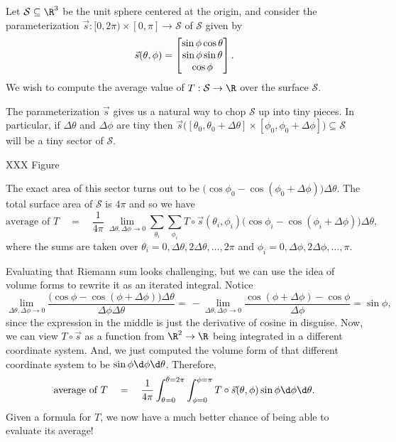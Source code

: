 \begin{example}
	\label{EXSURFACEAREABYDEF}
	Let $\mathcal S\subseteq \R^3$ be the unit sphere centered at the origin,
	and consider the parameterization $\vec s:[0,2\pi)\times[0,\pi]\to\mathcal S$ of $\mathcal S$ given
	by
	\[
		\vec s(\theta,\phi) = \begin{bmatrix}\sin\phi\cos\theta\\\sin\phi\sin\theta\\\cos\phi\end{bmatrix}.
	\]
	We wish to compute the average value of $T:\mathcal S\to\R$ over the surface $\mathcal S$.

	The parameterization $\vec s$ gives us a natural way to chop $\mathcal S$ up into tiny pieces.
	In particular, if $\Delta \theta$ and $\Delta \phi$ are tiny then $\vec s\big([\theta_0,\theta_0+\Delta
	\theta]\times[\phi_0,\phi_0+\Delta\phi]\big)\subseteq\mathcal S$ will be a tiny sector
	of $\mathcal S$.

	XXX Figure

	The exact area of this sector turns out to be $\big(\cos\phi_0-\cos(\phi_0+\Delta\phi)\big)\Delta\theta$.
	The total surface area of $\mathcal S$ is $4\pi$ and so we have
	\[
		\text{average of }T\quad=\quad \frac{1}{4\pi}\  \lim_{\Delta\theta,\Delta\phi\to0}
		\sum_{\theta_i}\sum_{\phi_i} T\circ \vec s(\theta_i,\phi_i)\Big(\cos\phi_i-\cos(\phi_i+\Delta\phi)\Big)\Delta\theta,
	\]
	where the sums are taken over $\theta_i=0,\Delta\theta,2\Delta\theta,\ldots,2\pi$ and
	$\phi_i=0,\Delta\phi,2\Delta\phi,\ldots,\pi$.

	Evaluating that Riemann sum looks challenging, but we can use the idea of volume
	forms to rewrite it as an iterated integral.  Notice
	\[
		\lim_{\Delta\theta,\Delta\phi\to0} \frac{\big(\cos\phi-\cos(\phi+\Delta\phi)\big)\Delta \theta}
		{\Delta \phi\Delta\theta}
		=\,-\lim_{\Delta\theta,\Delta\phi\to0} \frac{\cos(\phi+\Delta\phi)-\cos\phi}
		{\Delta \phi} = \sin\phi,
	\]
	since the expression in the middle is just the derivative of cosine in disguise.  Now,
	we can view $T\circ \vec s$ as a function from $\R^2\to\R$ being integrated in a different
	coordinate system.  And, we just computed the volume form of that different coordinate
	system to be $\sin\phi\d\phi\d\theta$.  Therefore,
	\[
		\text{average of }T\quad=\quad\frac{1}{4\pi}\int_{\theta=0}^{\theta=2\pi}\int_{\phi=0}^{\phi=\pi}
		T\circ \vec s(\theta,\phi)\sin\phi\d\phi\d\theta.
	\]
	Given a formula for $T$, we now have a much better chance of being able to evaluate its average!
\end{example}

